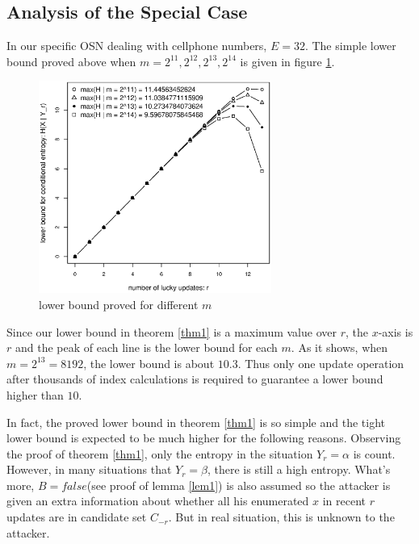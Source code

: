 \documentclass[10pt, conference, compsocconf]{IEEEtran}
\begin{document}
    \subsection{Analysis of the Special Case}
        In our specific OSN dealing with cellphone numbers,
        $E = 32$.
        The simple lower
        bound proved above when $m = 2^{11}, 2^{12}, 2^{13}, 2^{14}$ is given
        in figure \ref{lb_m}.

        \begin{figure}[!t]
        \centering
        \includegraphics[width=3in, trim=0mm 0mm 0mm 20mm]{lb_m.eps}
        \caption{lower bound proved for different $m$}\label{lb_m}
        \end{figure}

        Since our lower bound in theorem \ref{thm1} is a maximum value
        over $r$, the $x$-axis is $r$ and the peak of each line
        is the lower bound for each $m$. As it shows, when $m = 2^{13} = 8192$, the lower
        bound is about $10.3$.
        Thus only one update operation after thousands of index calculations is required
        to guarantee a lower bound higher than $10$.

        In fact, the proved lower bound in theorem \ref{thm1} is so
        simple and the tight lower bound is expected to be much higher
        for the following reasons.
        Observing the proof of theorem \ref{thm1}, only the
        entropy in the situation $Y_r = \alpha$ is count. However, in
        many situations that $Y_r = \beta$, there is still a high entropy.
        What's more, $B = false$(see proof of lemma \ref{lem1}) is also assumed so the attacker is
        given an extra information about whether all his enumerated $x$
        in recent $r$ updates are in candidate set $C_{-r}$. But
        in real situation, this is unknown to the attacker.
\end{document}
